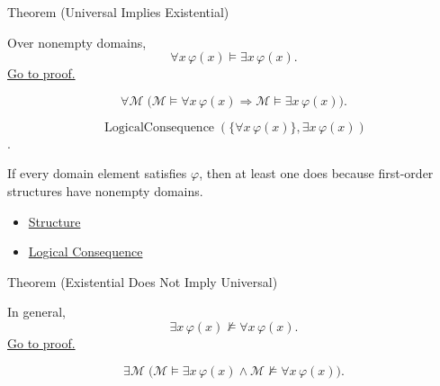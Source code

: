 \begin{theorembox}{Theorem (Universal Implies Existential)}
\begin{theorem}
\label{thm:universal-implies-existential}
Over nonempty domains,
\[
\forall x\,\varphi(x)\models \exists x\,\varphi(x).
\]
\hyperref[prf:universal-implies-existential]{Go to proof.}
\end{theorem}
\end{theorembox}

\begin{remark*}
\[
\forall \mathcal M\;
\bigl(\mathcal M\models\forall x\,\varphi(x)
\Rightarrow
\mathcal M\models\exists x\,\varphi(x)\bigr).
\]
\end{remark*}

\begin{remark*}
\[
  \operatorname{LogicalConsequence}(\{\forall x\,\varphi(x)\},\exists x\,\varphi(x))
\].
\end{remark*}

\begin{remark*}[Interpretation]
If every domain element satisfies \(\varphi\), then at least one does because
first-order structures have nonempty domains.
\end{remark*}

\begin{dependencies}
\begin{itemize}
  \item \hyperref[def:structure]{Structure}
  \item \hyperref[def:log-consequence]{Logical Consequence}
\end{itemize}
\end{dependencies}

\begin{theorembox}{Theorem (Existential Does Not Imply Universal)}
\begin{theorem}
\label{thm:existential-not-universal}
In general,
\[
\exists x\,\varphi(x)\not\models \forall x\,\varphi(x).
\]
\hyperref[prf:existential-not-universal]{Go to proof.}
\end{theorem}
\end{theorembox}

\begin{remark*}
\[
\exists \mathcal M\;
\bigl(\mathcal M\models\exists x\,\varphi(x)
\land
\mathcal M\not\models\forall x\,\varphi(x)\bigr).
\]
\end{remark*}

